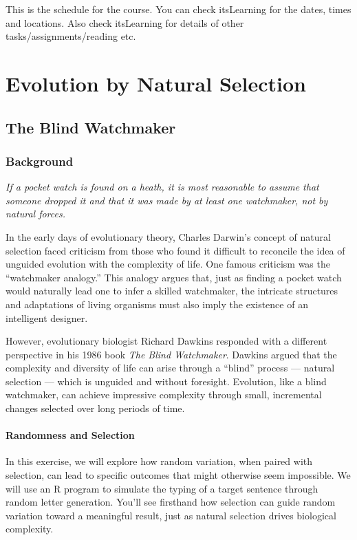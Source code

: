\documentclass[
  a4paper]{book}
\begin{document}
This is the schedule for the course. You can check itsLearning for the dates, times and locations.
Also check itsLearning for details of other tasks/assignments/reading etc.

\part{Evolution by Natural Selection}\label{part-evolution-by-natural-selection}

\chapter{The Blind Watchmaker}\label{the-blind-watchmaker}

\section{Background}\label{background}

\emph{If a pocket watch is found on a heath, it is most reasonable to assume that someone dropped it and that it was made by at least one watchmaker, not by natural forces.}

In the early days of evolutionary theory, Charles Darwin's concept of natural selection faced criticism from those who found it difficult to reconcile the idea of unguided evolution with the complexity of life. One famous criticism was the ``watchmaker analogy.'' This analogy argues that, just as finding a pocket watch would naturally lead one to infer a skilled watchmaker, the intricate structures and adaptations of living organisms must also imply the existence of an intelligent designer.

However, evolutionary biologist Richard Dawkins responded with a different perspective in his 1986 book \emph{The Blind Watchmaker}. Dawkins argued that the complexity and diversity of life can arise through a ``blind'' process --- natural selection --- which is unguided and without foresight. Evolution, like a blind watchmaker, can achieve impressive complexity through small, incremental changes selected over long periods of time.

\subsection{Randomness and Selection}\label{randomness-and-selection}

In this exercise, we will explore how random variation, when paired with selection, can lead to specific outcomes that might otherwise seem impossible. We will use an R program to simulate the typing of a target sentence through random letter generation. You'll see firsthand how selection can guide random variation toward a meaningful result, just as natural selection drives biological complexity.
\end{document}
